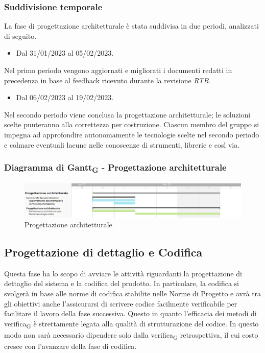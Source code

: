 \subsubsection{Suddivisione temporale}
La fase di progettazione architetturale è stata suddivisa in due periodi, analizzati di seguito.

\:
\begin{itemize}
	\item Dal 31/01/2023 al 05/02/2023.
\end{itemize}
Nel primo periodo vengono aggiornati e migliorati i documenti redatti in precedenza in base al feedback ricevuto durante la revisione \textit{RTB}.

\:
\begin{itemize}
	\item Dal 06/02/2023 al 19/02/2023.
\end{itemize}
Nel secondo periodo viene conclusa la progettazione architetturale; le soluzioni scelte punteranno alla correttezza per costruzione. Ciascun membro del gruppo si impegna ad approfondire autonomamente le tecnologie scelte nel secondo periodo e colmare eventuali lacune nelle conoscenze di strumenti, librerie e così via.

\subsubsection{Diagramma di Gantt\textsubscript{G} - Progettazione architetturale}

\begin{figure}[H]
\centering
\includegraphics[width=\textwidth]{img/4_progettazione.png}
\caption{Progettazione architetturale}
\end{figure}

\subsection{Progettazione di dettaglio e Codifica}
Questa fase ha lo scopo di avviare le attività riguardanti la progettazione di dettaglio del sistema e la codifica del prodotto.
In particolare, la codifica si svolgerà in base alle norme di codifica stabilite nelle Norme di Progetto e avrà tra gli obiettivi anche l’assicurarsi di scrivere codice facilmente verificabile per facilitare il lavoro della fase successiva. Questo in quanto l'efficacia dei metodi di verifica\textsubscript{G} è strettamente legata alla qualità di strutturazione del codice. In questo modo non sarà necessario dipendere solo dalla verifica\textsubscript{G} retrospettiva, il cui costo cresce con l'avanzare della fase di codifica.

